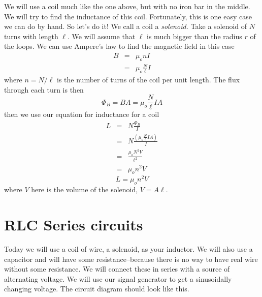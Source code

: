 We will use a coil much like the one above, but with no iron bar in the middle. We will try to find the inductance of this coil. Fortunately, this is one easy case we can do by hand. So let's do it! We call a coil a \emph{solenoid.} Take a solenoid of $N$ turns with length $\ell .$ We will assume that $\ell $ is much bigger than the radius $r$ of the loops. We can use Ampere's law to find the magnetic field in this case 
\begin{eqnarray*}
	B &=&\mu _{o}nI \\
	  &=&\mu _{o}\frac{N}{\ell }I
\end{eqnarray*}
where $n=N/\ell $ is the number of turns of the coil per unit length. The flux through each turn is then 
\begin{equation*}
	\Phi _{B}=BA=\mu _{o}\frac{N}{\ell }IA
\end{equation*}
then we use our equation for inductance for a coil
\begin{eqnarray*}
	L &=&N\frac{\Phi _{B}}{I} \\
	  &=&N\frac{\left( \mu _{o}\frac{N}{\ell }IA\right) }{I} \\
	  &=&\frac{\mu _{o}N^{2}V}{\ell ^{2}} \\
	  &=&\mu _{o}n^{2}V
\end{eqnarray*}
\begin{equation}
	L=\mu _{o}n^{2}V  \label{Solenoid Inductance}
\end{equation}
where $V$ here is the volume of the solenoid, $V=A\ell .$

\section{RLC Series circuits}

Today we will use a coil of wire, a solenoid, as your inductor. We will also use a capacitor and will have some resistance--because there is no way to have real wire without some resistance. We will connect these in series with a source of alternating voltage. We will use our signal generator to get a sinusoidally changing voltage. The circuit diagram should look like this.

